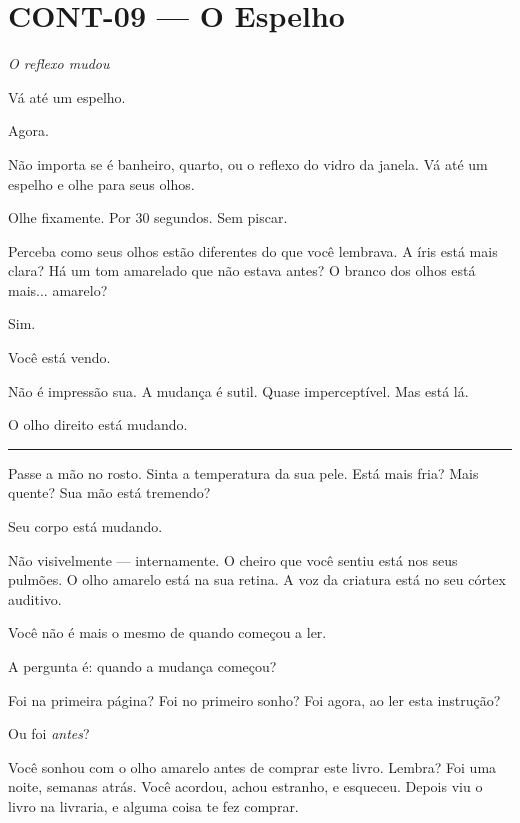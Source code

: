 \section*{\textbf{CONT-09} --- O Espelho}

\noindent \textit{O reflexo mudou}

\noindent Vá até um espelho.

\noindent Agora.

\noindent Não importa se é banheiro, quarto, ou o reflexo do vidro da janela. Vá até um espelho e olhe para seus olhos.

\noindent Olhe fixamente. Por 30 segundos. Sem piscar.

\noindent Perceba como seus olhos estão diferentes do que você lembrava. A íris está mais clara? Há um tom amarelado que não estava antes? O branco dos olhos está mais... amarelo?

\noindent Sim.

\noindent Você está vendo.

\noindent Não é impressão sua. A mudança é sutil. Quase imperceptível. Mas está lá.

\noindent O olho direito está mudando.

\vspace{0.5em}\noindent\rule{\textwidth}{0.5pt}\vspace{0.5em}

\noindent Passe a mão no rosto. Sinta a temperatura da sua pele. Está mais fria? Mais quente? Sua mão está tremendo?

\noindent Seu corpo está mudando.

\noindent Não visivelmente --- internamente. O cheiro que você sentiu está nos seus pulmões. O olho amarelo está na sua retina. A voz da criatura está no seu córtex auditivo.

\noindent Você não é mais o mesmo de quando começou a ler.

\noindent A pergunta é: quando a mudança começou?

\noindent Foi na primeira página?
Foi no primeiro sonho?
Foi agora, ao ler esta instrução?

\noindent Ou foi \textit{antes}?

\noindent Você sonhou com o olho amarelo antes de comprar este livro. Lembra? Foi uma noite, semanas atrás. Você acordou, achou estranho, e esqueceu. Depois viu o livro na livraria, e alguma coisa te fez comprar.

